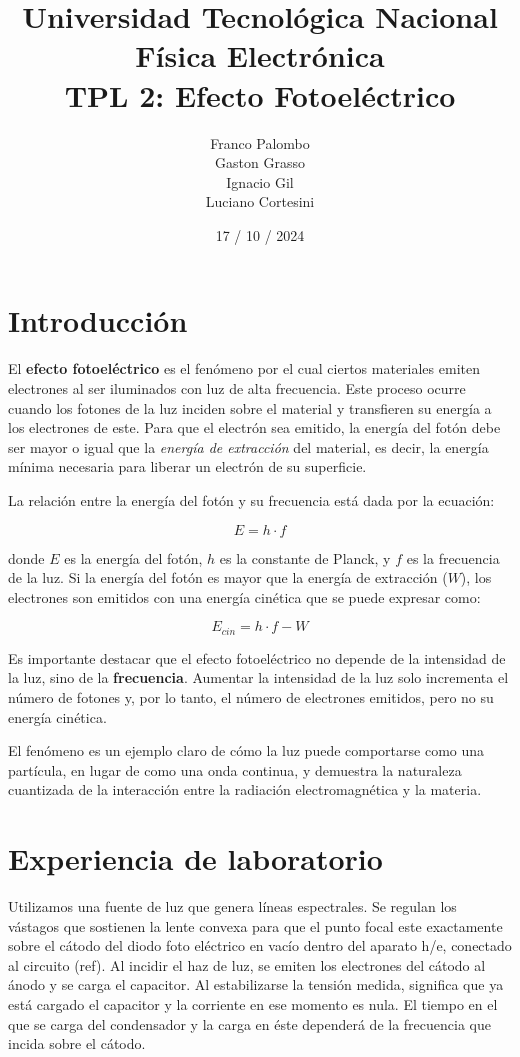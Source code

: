 \documentclass[a4paper,12pt]{report}
\title{%
  \fontsize{25}{0}\selectfont Universidad Tecnológica Nacional \\
  \fontsize{22}{30}\selectfont Física Electrónica \\
  \fontsize{18}{25}\selectfont TPL 2: Efecto Fotoeléctrico
}
\author{
Franco Palombo\\
Gaston Grasso\\
Ignacio Gil\\
Luciano Cortesini\\
}
\date{17 / 10 / 2024}
\begin{document}
\maketitle

\chapter{Introducción}
  El \textbf{efecto fotoeléctrico} es el fenómeno por el cual ciertos materiales emiten electrones al ser iluminados
  con luz de alta frecuencia. Este proceso ocurre cuando los fotones de la luz inciden sobre el material y transfieren
  su energía a los electrones de este. Para que el electrón sea emitido, la energía del fotón debe ser mayor o igual
  que la \textit{energía de extracción} del material, es decir, la energía mínima necesaria para liberar un electrón de
  su superficie.


  La relación entre la energía del fotón y su frecuencia está dada por la ecuación:

  \[
    E = h \cdot f
  \]

  donde \(E\) es la energía del fotón, \(h\) es la constante de Planck, y \(f\) es la frecuencia de la luz. Si la
  energía del fotón es mayor que la energía de extracción (\(W\)), los electrones son emitidos con una energía cinética
  que se puede expresar como:


  \[
    E_{cin} = h \cdot f - W
  \]

  Es importante destacar que el efecto fotoeléctrico no depende de la intensidad de la luz, sino de la
  \textbf{frecuencia}. Aumentar la intensidad de la luz solo incrementa el número de fotones y, por lo tanto, el número
  de electrones emitidos, pero no su energía cinética.

  El fenómeno es un ejemplo claro de cómo la luz puede comportarse como una partícula, en lugar de como una onda
  continua, y demuestra la naturaleza cuantizada de la interacción entre la radiación electromagnética y la materia.

\chapter{Experiencia de laboratorio}
  Utilizamos una fuente de luz que genera líneas espectrales. Se regulan los vástagos que sostienen la lente convexa
  para que el punto focal este exactamente sobre el cátodo del diodo foto eléctrico en vacío dentro del aparato h/e,
  conectado al circuito (ref). Al incidir el haz de luz, se emiten los electrones del cátodo al ánodo y se carga el
  capacitor. Al estabilizarse la tensión medida, significa que ya está cargado el capacitor y la corriente en ese
  momento es nula. El tiempo en el que se carga del condensador y la carga en éste dependerá de la frecuencia que
  incida sobre el cátodo.
\end{document}
